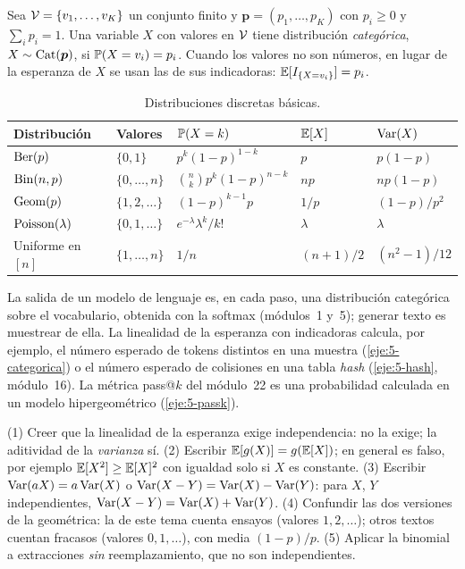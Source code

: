 \begin{definicion}[Categórica]
Sea $\mathcal{V}=\{v_1,\dots,v_K\}$ un conjunto finito y $\bm p=(p_1,\dots,p_K)$ con $p_i\ge0$ y $\sum_ip_i=1$. Una variable $X$ con valores en $\mathcal{V}$ tiene distribución \emph{categórica}, $X\sim\operatorname{Cat}(\bm p)$, si $\mathbb{P}(X=v_i)=p_i$. Cuando los valores no son números, en lugar de la esperanza de $X$ se usan las de sus indicadoras: $\mathbb{E}[I_{\{X=v_i\}}]=p_i$.
\end{definicion}

\begin{table}[h]
\centering
\begin{tabular}{@{}lllll@{}}
\toprule
Distribución & Valores & $\mathbb{P}(X=k)$ & $\mathbb{E}[X]$ & $\operatorname{Var}(X)$ \\
\midrule
$\operatorname{Ber}(p)$ & $\{0,1\}$ & $p^{k}(1-p)^{1-k}$ & $p$ & $p(1-p)$ \\
$\operatorname{Bin}(n,p)$ & $\{0,\dots,n\}$ & $\binom nk p^{k}(1-p)^{n-k}$ & $np$ & $np(1-p)$ \\
$\operatorname{Geom}(p)$ & $\{1,2,\dots\}$ & $(1-p)^{k-1}p$ & $1/p$ & $(1-p)/p^{2}$ \\
$\operatorname{Poisson}(\lambda)$ & $\{0,1,\dots\}$ & $e^{-\lambda}\lambda^{k}/k!$ & $\lambda$ & $\lambda$ \\
Uniforme en $[n]$ & $\{1,\dots,n\}$ & $1/n$ & $(n+1)/2$ & $(n^{2}-1)/12$ \\
\bottomrule
\end{tabular}
\caption{Distribuciones discretas básicas.}
\label{tab:t5-discretas}
\end{table}

\begin{observacion}
La salida de un modelo de lenguaje es, en cada paso, una distribución categórica sobre el vocabulario, obtenida con la softmax (módulos~1 y~5); generar texto es muestrear de ella. La linealidad de la esperanza con indicadoras calcula, por ejemplo, el número esperado de tokens distintos en una muestra (\cref{eje:5-categorica}) o el número esperado de colisiones en una tabla \emph{hash} (\cref{eje:5-hash}, módulo~16). La métrica pass@$k$ del módulo~22 es una probabilidad calculada en un modelo hipergeométrico (\cref{eje:5-passk}).
\end{observacion}

\begin{observacion}
(1) Creer que la linealidad de la esperanza exige independencia: no la exige; la aditividad de la \emph{varianza} sí. (2) Escribir $\mathbb{E}[g(X)]=g(\mathbb{E}[X])$; en general es falso, por ejemplo $\mathbb{E}[X^{2}]\ge\mathbb{E}[X]^{2}$ con igualdad solo si $X$ es constante. (3) Escribir $\operatorname{Var}(aX)=a\operatorname{Var}(X)$ o $\operatorname{Var}(X-Y)=\operatorname{Var}(X)-\operatorname{Var}(Y)$: para $X$, $Y$ independientes, $\operatorname{Var}(X-Y)=\operatorname{Var}(X)+\operatorname{Var}(Y)$. (4) Confundir las dos versiones de la geométrica: la de este tema cuenta ensayos (valores $1,2,\dots$); otros textos cuentan fracasos (valores $0,1,\dots$), con media $(1-p)/p$. (5) Aplicar la binomial a extracciones \emph{sin} reemplazamiento, que no son independientes.
\end{observacion}

